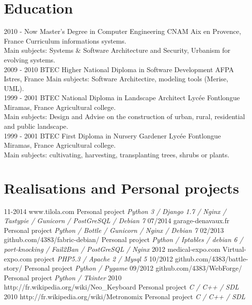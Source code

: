 \documentclass[]{friggeri-cv}
\begin{document}
\section{Education}
\begin{entrylist}
  \entry
    {2010 - Now}
    {Master's Degree in Computer Engineering}
    {CNAM Aix en Provence, France}
    {Curriculum informations systems.\\
    Main subjects: Systems \& Software Architecture and Security, Urbanism for evolving systems.\\}
  \entry
    {2009 - 2010}
    {BTEC Higher National Diploma in Software Development}
    {AFPA Istres, France}
    {Main subjects: Software Architectire, modeling tools (Merise, UML).\\}
  \entry
    {1999 - 2001}
    {BTEC National Diploma in Landscape Architect}
    {Lycée Fontlongue Miramas, France}
    {Agricultural college.\\
    Main subjects: Design and Advise on the construction of urban, rural, residential and public landscape.\\}
  \entry
    {1999 - 2001}
    {BTEC First Diploma in Nursery Gardener}
    {Lycée Fontlongue Miramas, France}
    {Agricultural college.\\
    Main subjects: cultivating, harvesting, transplanting trees, shrubs or plants.}
\end{entrylist}

\section{Realisations and Personal projects}
\begin{entrylist}
  \entry
    {11-2014}
    {www.tilola.com}
    {Personal project}
    {\emph{Python 3 / Django 1.7 / Nginx / Tastypie / Gunicorn / PostGreSQL / Debian 7}}
  \entry
    {07/2014}
    {garage-denavaux.fr}
    {Personal project}
    {\emph{Python / Bottle / Gunicorn / Nginx / Debian 7}}
  \entry
    {02/2013}
    {github.com/4383/fabric-debian/}
    {Personal project}
    {\emph{Python / Iptables /  debian 6 / port-knocking / Fail2Ban / PostGreSQL / Nginx}}
  \entry
    {2012}
    {medical-expo.com}
    {Virtual-expo.com project}
    {\emph{PHP5.3 / Apache 2 / Mysql 5}}
  \entry
    {10/2012}
    {github.com/4383/battle-story/}
    {Personal project}
    {\emph{Python / Pygame}}
  \entry
    {09/2012}
    {github.com/4383/WebForge/}
    {Personal project}
    {\emph{Python / Tkinter}}
  \entry
    {2010}
    {http://fr.wikipedia.org/wiki/Neo\_Keyboard}
    {Personal project}
    {\emph{C / C++ / SDL}}
  \entry
    {2010}
    {http://fr.wikipedia.org/wiki/Metronomix}
    {Personal project}
    {\emph{C / C++ / SDL}}
\end{entrylist}
\end{document}
